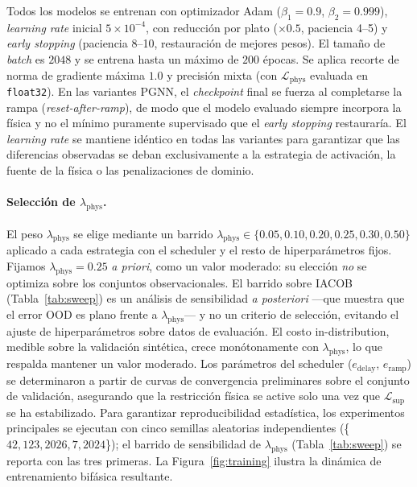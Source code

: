 \documentclass[sigconf,ACM]{acmart}
\begin{document}
Todos los modelos se entrenan con optimizador Adam ($\beta_1=0.9$, $\beta_2=0.999$), \emph{learning rate} inicial $5\times10^{-4}$, con reducción por plato ($\times 0.5$, paciencia 4--5) y \emph{early stopping} (paciencia 8--10, restauración de mejores pesos). El tamaño de \emph{batch} es $2048$ y se entrena hasta un máximo de $200$ épocas. Se aplica recorte de norma de gradiente máxima $1.0$ y precisión mixta (con $\mathcal{L}_\mathrm{phys}$ evaluada en \texttt{float32}). En las variantes PGNN, el \emph{checkpoint} final se fuerza al completarse la rampa (\emph{reset-after-ramp}), de modo que el modelo evaluado siempre incorpora la física y no el mínimo puramente supervisado que el \emph{early stopping} restauraría. El \emph{learning rate} se mantiene idéntico en todas las variantes para garantizar que las diferencias observadas se deban exclusivamente a la estrategia de activación, la fuente de la física o las penalizaciones de dominio.

\paragraph{Selección de $\lambda_{\mathrm{phys}}$.} El peso $\lambda_{\mathrm{phys}}$ se elige mediante un barrido $\lambda_{\mathrm{phys}} \in \{0.05, 0.10, 0.20, 0.25, 0.30, 0.50\}$ aplicado a cada estrategia con el scheduler y el resto de hiperparámetros fijos. Fijamos $\lambda_{\mathrm{phys}}=0.25$ \emph{a priori}, como un valor moderado: su elección \emph{no} se optimiza sobre los conjuntos observacionales. El barrido sobre IACOB (Tabla~\ref{tab:sweep}) es un análisis de sensibilidad \emph{a posteriori} ---que muestra que el error OOD es plano frente a $\lambda_{\mathrm{phys}}$--- y no un criterio de selección, evitando el ajuste de hiperparámetros sobre datos de evaluación. El costo in-distribution, medible sobre la validación sintética, crece monótonamente con $\lambda_{\mathrm{phys}}$, lo que respalda mantener un valor moderado. Los parámetros del scheduler ($e_{\mathrm{delay}}$, $e_{\mathrm{ramp}}$) se determinaron a partir de curvas de convergencia preliminares sobre el conjunto de validación, asegurando que la restricción física se active solo una vez que $\mathcal{L}_{\mathrm{sup}}$ se ha estabilizado. Para garantizar reproducibilidad estadística, los experimentos principales se ejecutan con cinco semillas aleatorias independientes (\{$42, 123, 2026, 7, 2024$\}); el barrido de sensibilidad de $\lambda_{\mathrm{phys}}$ (Tabla~\ref{tab:sweep}) se reporta con las tres primeras. La Figura~\ref{fig:training} ilustra la dinámica de entrenamiento bifásica resultante.
\end{document}
